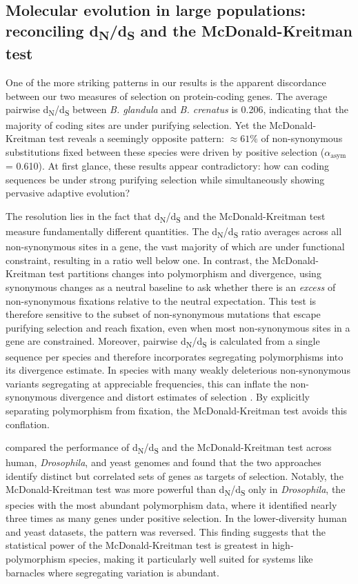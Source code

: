 \documentclass[11pt]{article}
\newcommand{\dnds}{d\textsubscript{N}/d\textsubscript{S}\xspace}
\newcommand{\bgla}{\textit{B. glandula}\xspace}
\begin{document}
\subsection*{Molecular evolution in large populations: reconciling \dnds{} and the
McDonald-Kreitman test}\label{sec:discussion_dnds_mkt}

One of the more striking patterns in our results is the apparent discordance between
our two measures of selection on protein-coding genes.
The average pairwise \dnds{} between \bgla{} and \textit{B. crenatus} is 0.206,
indicating that the majority of coding sites are under purifying selection.
Yet the McDonald-Kreitman test reveals a seemingly opposite pattern: $\approx61\%$
of non-synonymous substitutions fixed between these species were driven by
positive selection ($\alpha_\text{asym}$ = 0.610).
At first glance, these results appear contradictory: how can coding sequences be
under strong purifying selection while simultaneously showing pervasive adaptive
evolution?
\vspace{0.2cm}

The resolution lies in the fact that \dnds{} and the McDonald-Kreitman test measure
fundamentally different quantities. The \dnds{} ratio averages across all
non-synonymous sites in a gene, the vast majority of which are under functional
constraint, resulting in a ratio well below one. In contrast, the McDonald-Kreitman
test partitions changes into polymorphism and divergence, using synonymous changes
as a neutral baseline to ask whether there is an \textit{excess} of non-synonymous
fixations relative to the neutral expectation. This test is therefore sensitive to
the subset of non-synonymous mutations that escape purifying selection and reach
fixation, even when most non-synonymous sites in a gene are constrained.
Moreover, pairwise \dnds{} is calculated from a single sequence per species and
therefore incorporates segregating polymorphisms into its divergence estimate. In
species with many weakly deleterious non-synonymous variants segregating at
appreciable frequencies, this can inflate the non-synonymous divergence and distort
estimates of selection \citep{li_reverse_2008}. By explicitly separating
polymorphism from fixation, the McDonald-Kreitman test avoids this conflation.
\vspace{0.2cm}

\cite{li_reverse_2008} compared the performance of \dnds{} and the McDonald-Kreitman
test across human, \textit{Drosophila}, and yeast genomes and found that the two
approaches identify distinct but correlated sets of genes as targets of selection.
Notably, the McDonald-Kreitman test was more powerful than \dnds{} only in
\textit{Drosophila}, the species with the most abundant polymorphism data, where it
identified nearly three times as many genes under positive selection. In the
lower-diversity human and yeast datasets, the pattern was reversed. This finding
suggests that the statistical power of the McDonald-Kreitman test is greatest in
high-polymorphism species, making it particularly well suited for systems like
barnacles where segregating variation is abundant.
\vspace{0.2cm}
\end{document}
